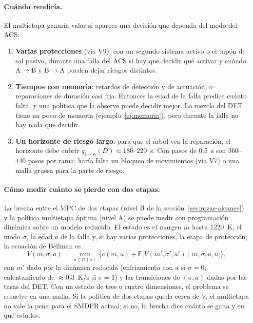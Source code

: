 \paragraph{Cuándo rendiría.} El multietapa ganaría valor si aparece una decisión que dependa del
modo del ACS:
\begin{enumerate}
  \item \textbf{Varias protecciones} (vía V9): con un segundo sistema activo o el tapón de sal
        pasivo, durante una falla del ACS sí hay que decidir qué activar y cuándo. A$\to$B y
        B$\to$A pueden dejar riesgos distintos.
  \item \textbf{Tiempos con memoria}: retardos de detección y de actuación, o reparaciones de
        duración casi fija. Entonces la edad de la falla predice cuánto falta, y una política que
        la observe puede decidir mejor. La mezcla del DET tiene un poco de memoria
        (ejemplo~\ref{ej:memoria}), pero durante la falla no hay nada que decidir.
  \item \textbf{Un horizonte de riesgo largo}: para que el árbol vea la reparación, el horizonte
        debe cubrir $q_{1-\alpha}(D)\approx180$--220~s. Con pasos de 0.5~s son 360--440 pasos por
        rama; haría falta un bloqueo de movimientos (vía V7) o una malla gruesa para la parte de
        riesgo.
\end{enumerate}

\paragraph{Cómo medir cuánto se pierde con dos etapas.} La brecha entre el MPC de dos etapas
(nivel B de la sección~\ref{sec:rozas-alcance}) y la política multietapa óptima (nivel A) se puede
medir con programación dinámica sobre un modelo reducido. El estado es el margen $m$ hasta
1220~K, el modo $\sigma$, la edad $a$ de la falla y, si hay varias protecciones, la etapa de
protección; la ecuación de Bellman es
\[
V(m,\sigma,a)=\min_{u\in\mathcal U(\sigma)}\Big\{c(m,u)+\mathbb E\big[V(m',\sigma',a')\mid m,\sigma,a,u\big]\Big\},
\]
con $m'$ dado por la dinámica reducida (enfriamiento con $u$ si $\sigma=0$; calentamiento de
$\approx0.3$~K/s si $\sigma=1$) y las transiciones de $(\sigma,a)$ dadas por las tasas del DET. Con
un estado de tres o cuatro dimensiones, el problema se resuelve en una malla. Si la política de
dos etapas queda cerca de $V$, el multietapa no vale la pena para el SMDFR actual; si no, la
brecha dice cuánto se gana y en qué estados.

